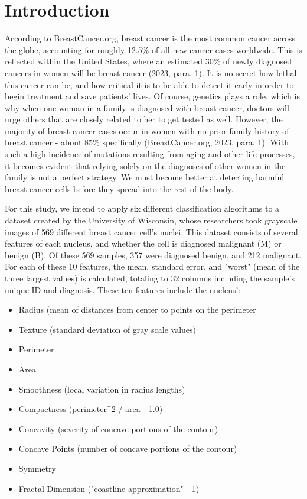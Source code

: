 \documentclass[conference]{IEEEtran}
\begin{document}
\section{Introduction}
According to BreastCancer.org, breast cancer is the most common cancer across the globe, accounting for roughly 12.5\% of all new cancer cases worldwide. This is reflected within the United States, where an estimated 30\% of newly diagnosed cancers in women will be breast cancer (2023, para. 1). It is no secret how lethal this cancer can be, and how critical it is to be able to detect it early in order to begin treatment and save patients' lives. Of course, genetics plays a role, which is why when one woman in a family is diagnosed with breast cancer, doctors will urge others that are closely related to her to get tested as well. However, the majority of breast cancer cases occur in women with no prior family history of breast cancer - about 85\% specifically (BreastCancer.org, 2023, para. 1). With such a high incidence of mutations resulting from aging and other life processes, it becomes evident that relying solely on the diagnoses of other women in the family is not a perfect strategy. We must become better at detecting harmful breast cancer cells before they spread into the rest of the body.

For this study, we intend to apply six different classification algorithms to a dataset created by the University of Wisconsin, whose researchers took grayscale images of 569 different breast cancer cell's nuclei. This dataset consists of several features of each nucleus, and whether the cell is diagnosed malignant (M) or benign (B). Of these 569 samples, 357 were diagnosed benign, and 212 malignant. For each of these 10 features, the mean, standard error, and "worst" (mean of the three largest values) is calculated, totaling to 32 columns including the sample's unique ID and diagnosis. These ten features include the nucleus':

\begin{itemize}
	\item Radius (mean of distances from center to points on the perimeter
 	\item Texture (standard deviation of gray scale values)
  	\item Perimeter
   	\item Area
    	\item Smoothness (local variation in radius lengths)
     	\item Compactness (perimeter^2 / area - 1.0)
      	\item Concavity (severity of concave portions of the contour)
       	\item Concave Points (number of concave portions of the contour)
	\item Symmetry
 	\item Fractal Dimension ("coastline approximation" - 1)
\end{itemize}
\end{document}
